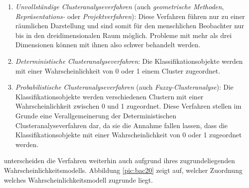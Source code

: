 \begin{enumerate}
	\item \textit{Unvollständige Clusteranalyseverfahren} (auch \textit{geometrische Methoden}, \textit{Repräsentations-} oder \textit{Projektverfahren}): Diese Verfahren führen nur zu einer räumlichen Darstellung und sind somit für den menschlichen Beobachter nur bis in den dreidimensionalen Raum möglich. Probleme mit mehr als drei Dimensionen können mit ihnen also schwer behandelt werden.
	\item \textit{Deterministische Clusteranalyseverfahren}: Die Klassifikationsobjekte werden mit einer Wahrscheinlichkeit von 0 oder 1 einem Cluster zugeordnet. 
	\item \textit{Probabilistische Clusteranalyseverfahren} (auch \textit{Fuzzy-Clusteranalyse}): Die Klassifikationsobjekte werden verschiedenen Clustern mit einer Wahrscheinlichkeit zwischen 0 und 1 zugeordnet. Diese Verfahren stellen im Grunde eine Verallgemeinerung der Deterministischen Clusteranalyseverfahren dar, da sie die Annahme fallen lassen, dass die Klassifikationsobjekte mit einer Wahrscheinlichkeit von 0 oder 1 zugeordnet werden.
\end{enumerate}

\citet[S. 21]{Bacher.2010} unterscheiden die Verfahren weiterhin auch aufgrund ihres zugrundeliegenden Wahrscheinlichkeitsmodells. Abbildung \ref{pic:bac20} zeigt auf, welcher Zuordnung welches Wahrscheinlichkeitsmodell zugrunde liegt. 